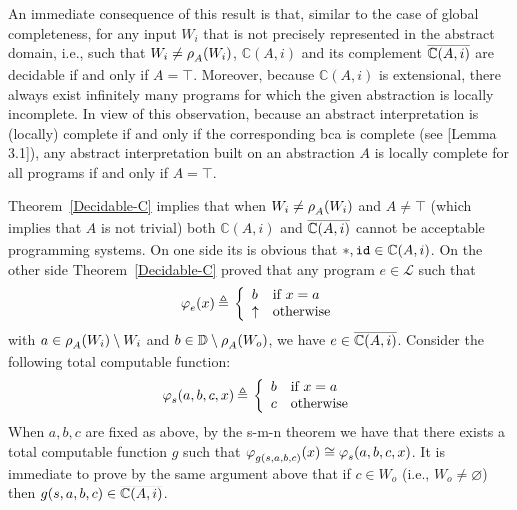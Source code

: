 \documentclass[runningheads]{llncs}
\def\ok#1{\mbox{\raisebox{0ex}[1ex][1ex]{$#1$}}}
\def\bbbc{{\mathbb{C}}}
\newcommand{\ccL}{\mathscr{L}}
\newcommand{\Domain}{\mathbb{D}}
\newcommand{\pfunction}[3]{\ok{\varphi^{#2\, #3}_{#1}}}
\newcommand{\auco}[2]{\ok{\rho^{#1}_{#2}}}
\newcommand{\compl}[1]{\ok{\overline{#1}}}
\newcommand{\ud}{\ok{\:\triangleq\:}}
\def\ok#1{\mbox{\raisebox{0ex}[1ex][1ex]{$#1$}}}
\def\cAA{\ensuremath{A}}
\begin{document}
An immediate consequence of this result is that, similar to the case of global completeness, for any input $W_i$ that is not precisely represented in the abstract domain, i.e., such that $W_i\neq\auco{}{A}(W_i)$, $\bbbc(\cAA,i)$ and its complement $\compl{\bbbc(\cAA,i)}$ are decidable if and only if $\cAA=\top$. Moreover, because $\bbbc(\cAA,i)$ is extensional, 
there always exist infinitely many 
programs for which the given abstraction is locally incomplete.  
In view of this observation, because an abstract interpretation is (locally) complete if and only if the corresponding bca is complete (see \cite{GRS00}[Lemma 3.1]), any abstract interpretation built on an abstraction $\cAA$ is locally complete for all programs if and only if $\cAA=\top$.

\medskip 

Theorem~\ref{Decidable-C} implies that when $W_i\neq\auco{}{A}(W_i)$ and $\cAA\neq\top$ (which implies that $\cAA$ is not trivial) both $\bbbc(\cAA,i)$ and $\compl{\bbbc(\cAA,i)}$ cannot be acceptable programming systems. On one side its is obvious that $*,{\tt id}\in \bbbc(\cAA,i)$. On the other side Theorem~\ref{Decidable-C} proved that any program 
$e\in\ccL$ such that
\begin{equation}\label{incomplete-prog}
    \pfunction{e}{}{}(x)\ud \left\{
    \begin{array}{ll}
       b & \mbox{if $x=a$}\\
       \uparrow &\mbox{otherwise}
    \end{array}
    \right .
\end{equation}
with $a\in \auco{}{A}(W_i)\setminus W_i$ and $b\in\Domain\setminus\auco{}{A}(W_o)$, we have $e\in\compl{\bbbc(\cAA,i)}$. 
Consider the following total computable function:
\begin{equation}\label{selection}
\pfunction{s}{}{}(a,b,c,x)\ud \left\{
    \begin{array}{ll}
       b & \mbox{if $x=a$}\\
       c &\mbox{otherwise}
    \end{array}
    \right .
\end{equation}
When $a,b,c$ are fixed as above, by the s-m-n theorem we have that there exists a total computable function $g$ such that $\pfunction{g(s,a,b,c)}{}{}(x)\cong\pfunction{s}{}{}(a,b,c,x)$.
It is immediate to prove by the same argument above that 
if $c\in W_o$ (i.e., $W_o\neq\varnothing$) then 
$g(s,a,b,c)\in\compl{\bbbc(\cAA,i)}$. 
\end{document}
